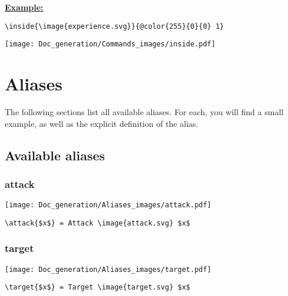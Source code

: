 \documentclass{article}
\begin{document}
\textbf{\underline{Example:}}

\begin{center}
\begin{BVerbatim}
\inside{\image{experience.svg}}{@color{255}{0}{0} 1}
\end{BVerbatim}
\end{center}
\begin{center}
\texttt{[image: Doc\_generation/Commands\_images/inside.pdf]}
\end{center}





\newpage
\section{Aliases}
The following sections list all available aliases. For each, you will find a small example, as well as the explicit definition of the alias.

\subsection{Available aliases}


\subsubsection{attack}
\begin{minipage}{0.45\linewidth}
\raggedright
\begin{spverbatim}
\end{spverbatim}
\end{minipage}
\begin{minipage}{0.45\linewidth}
\raggedleft
\texttt{[image: Doc\_generation/Aliases\_images/attack.pdf]}
\end{minipage}
\begin{center}
\begin{BVerbatim}
\attack{$x$} = Attack \image{attack.svg} $x$
\end{BVerbatim}
\end{center}

\subsubsection{target}
\begin{minipage}{0.45\linewidth}
\raggedright
\begin{spverbatim}
\end{spverbatim}
\end{minipage}
\begin{minipage}{0.45\linewidth}
\raggedleft
\texttt{[image: Doc\_generation/Aliases\_images/target.pdf]}
\end{minipage}
\begin{center}
\begin{BVerbatim}
\target{$x$} = Target \image{target.svg} $x$
\end{BVerbatim}
\end{center}
\end{document}
